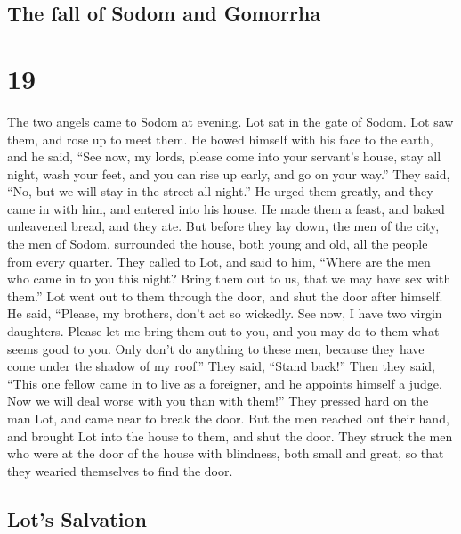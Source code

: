 \hypertarget{the-fall-of-sodom-and-gomorrha}{%
\subsection{The fall of Sodom and
Gomorrha}\label{the-fall-of-sodom-and-gomorrha}}

\hypertarget{section-18}{%
\section{19}\label{section-18}}

 The two angels came to Sodom at evening. Lot sat in the
gate of Sodom. Lot saw them, and rose up to meet them. He bowed himself
with his face to the earth,  and he said, ``See now, my
lords, please come into your servant's house, stay all night, wash your
feet, and you can rise up early, and go on your way.'' They said, ``No,
but we will stay in the street all night.''  He urged them
greatly, and they came in with him, and entered into his house. He made
them a feast, and baked unleavened bread, and they ate. 
But before they lay down, the men of the city, the men of Sodom,
surrounded the house, both young and old, all the people from every
quarter.  They called to Lot, and said to him, ``Where are
the men who came in to you this night? Bring them out to us, that we may
have sex with them.''  Lot went out to them through the
door, and shut the door after himself.  He said, ``Please,
my brothers, don't act so wickedly.  See now, I have two
virgin daughters. Please let me bring them out to you, and you may do to
them what seems good to you. Only don't do anything to these men,
because they have come under the shadow of my roof.'' 
They said, ``Stand back!'' Then they said, ``This one fellow came in to
live as a foreigner, and he appoints himself a judge. Now we will deal
worse with you than with them!'' They pressed hard on the man Lot, and
came near to break the door.  But the men reached out
their hand, and brought Lot into the house to them, and shut the door.
 They struck the men who were at the door of the house
with blindness, both small and great, so that they wearied themselves to
find the door.

\hypertarget{lots-salvation}{%
\subsection{Lot's Salvation}\label{lots-salvation}}

